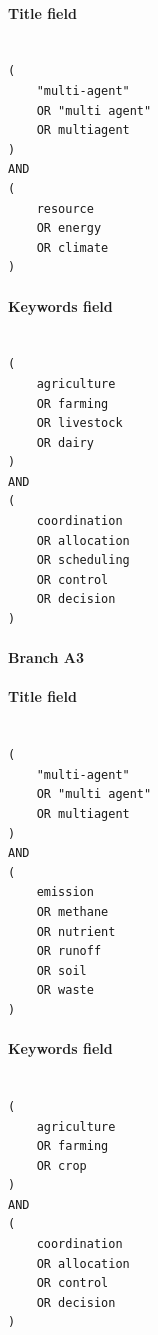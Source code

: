 \paragraph{Title field}

\begin{lstlisting}

(
    "multi-agent"
    OR "multi agent"
    OR multiagent
)
AND
(
    resource
    OR energy
    OR climate
)

\end{lstlisting}

\paragraph{Keywords field}

\begin{lstlisting}

(
    agriculture
    OR farming
    OR livestock
    OR dairy
)
AND
(
    coordination
    OR allocation
    OR scheduling
    OR control
    OR decision
)

\end{lstlisting}

\paragraph{Branch A3}

\paragraph{Title field}

\begin{lstlisting}

(
    "multi-agent"
    OR "multi agent"
    OR multiagent
)
AND
(
    emission
    OR methane
    OR nutrient
    OR runoff
    OR soil
    OR waste
)

\end{lstlisting}

\paragraph{Keywords field}

\begin{lstlisting}

(
    agriculture
    OR farming
    OR crop
)
AND
(
    coordination
    OR allocation
    OR control
    OR decision
)

\end{lstlisting}

